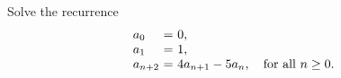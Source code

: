 \begin{ex}
  Solve the recurrence
    \begin{equation*}
    \begin{array}{l@{~}c@{~}l}
      a_0 &=& 0, \\
      a_1 &=& 1, \\
      a_{n+2} &=& 4a_{n+1} - 5a_{n}, \quad\mbox{for all $n\geq 0$.}\\
    \end{array}
  \end{equation*}
\end{ex}
